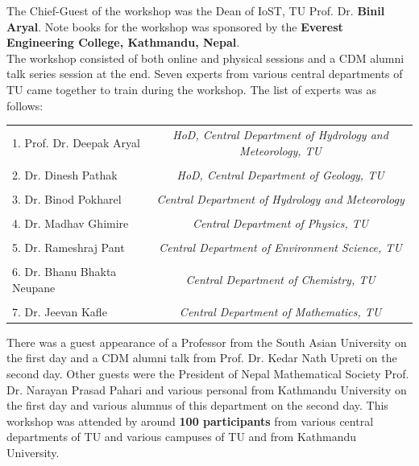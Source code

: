 \documentclass[a4paper,12pt]{report}
\begin{document}
\vspace{5mm}
\noindent
The Chief-Guest of the workshop was the Dean of IoST, TU Prof. Dr. \textbf{Binil Aryal}.
\clearpage
\noindent
Note books for the workshop was sponsored by the \textbf{Everest Engineering College, Kathmandu, Nepal}.\\
The workshop consisted of both online and physical sessions and a CDM alumni talk series session at the end. Seven experts from various central departments of TU came together to train during the workshop. The list of experts was as follows:


\begin{table}[h!]
\centering
  \begin{tcolorbox}[colframe=blue!52, colback=white, width=\linewidth]
\centering  \footnotesize
\begin{tabular}{l||c}

    1. Prof. Dr. Deepak Aryal &
    \textit{HoD, Central Department of Hydrology and Meteorology, TU}\\
    \\
    2. Dr. Dinesh Pathak &
    \textit{HoD, Central Department of Geology, TU}\\
    \\
    3. Dr. Binod Pokharel &
    \textit{Central Department of Hydrology and Meteorology}\\
    \\
    4. Dr. Madhav Ghimire &
    \textit{Central Department of Physics, TU}\\
    \\
    5. Dr. Rameshraj Pant &
    \textit{Central Department of Environment Science, TU}\\
    \\
    6. Dr. Bhanu Bhakta Neupane &
    \textit{Central Department of Chemistry, TU}\\
    \\
    7. Dr. Jeevan Kafle &
    \textit{Central Department of Mathematics, TU}\\
    \end{tabular}
  \end{tcolorbox}
\end{table}
\noindent
There was a guest appearance of a Professor from the South Asian University on the first day and a CDM alumni talk from Prof. Dr. Kedar Nath Upreti on the second day. Other guests were the President of Nepal Mathematical Society Prof. Dr. Narayan Prasad Pahari and various personal from Kathmandu University on the first day and various alumnus of this department on the second day. This workshop was attended by around \textbf{100 participants} from various central departments of TU and various campuses of TU and from Kathmandu University.
\end{document}
